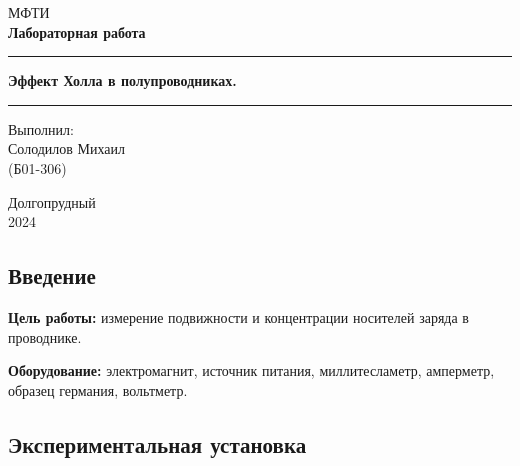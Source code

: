 \documentclass[a4paper, 12pt]{article}
\begin{document}

\begin{titlepage}
    \begin{center}
        \vspace*{5cm}
        \Huge МФТИ
        \vspace*{2cm}\\
        \LARGE \textbf{Лабораторная работа}
        \\\vspace*{0.25cm}

        \noindent\rule{\textwidth}{1pt}
        \vspace*{-0.25cm}

        \huge \textbf{Эффект Холла в полупроводниках.}
        \noindent\rule{\textwidth}{1pt}

        \vfill

        \begin{flushright}
            \begin{minipage}{.4\textwidth}
            \Large Выполнил: \\ Солодилов Михаил \\ (Б01-306)
            \end{minipage}
        \end{flushright}

        \vfill

        \normalsize Долгопрудный \\2024
    \end{center}
\end{titlepage}

\restoregeometry

\begin{center}
    \section*{Введение}
\end{center}

\noindent \textbf{Цель работы:}
измерение подвижности и концентрации носителей заряда в проводнике.

\bigskip

\noindent \textbf{Оборудование:}
электромагнит, источник питания, миллитесламетр, амперметр,
образец германия, вольтметр.

\bigskip

\subsection*{Экспериментальная установка}
\end{document}
